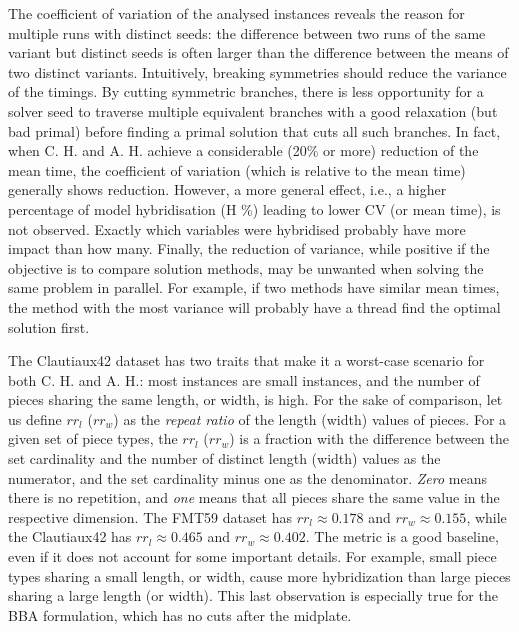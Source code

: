 \documentclass[ppgc,tese,english,formais,babel]{iiufrgs}
\begin{document}
The coefficient of variation of the analysed instances reveals the reason for multiple runs with distinct seeds: the difference between two runs of the same variant but distinct seeds is often larger than the difference between the means of two distinct variants.
Intuitively, breaking symmetries should reduce the variance of the timings.
By cutting symmetric branches, there is less opportunity for a solver seed to traverse multiple equivalent branches with a good relaxation (but bad primal) before finding a primal solution that cuts all such branches.
In fact, when C. H. and A. H. achieve a considerable (20\% or more) reduction of the mean time, the coefficient of variation (which is relative to the mean time) generally shows reduction.
However, a more general effect, i.e., a higher percentage of model hybridisation (H \%) leading to lower CV (or mean time), is not observed.
Exactly which variables were hybridised probably have more impact than how many.
Finally, the reduction of variance, while positive if the objective is to compare solution methods, may be unwanted when solving the same problem in parallel.
For example, if two methods have similar mean times, the method with the most variance will probably have a thread find the optimal solution first.

The Clautiaux42 dataset has two traits that make it a worst-case scenario for both C. H. and A. H.: most instances are small instances, and the number of pieces sharing the same length, or width, is high.
For the sake of comparison, let us define \(rr_l\) (\(rr_w\)) as the \emph{repeat ratio} of the length (width) values of pieces.
For a given set of piece types, the \(rr_l\) (\(rr_w\)) is a fraction with the difference between the set cardinality and the number of distinct length (width) values as the numerator, and the set cardinality minus one as the denominator.
\emph{Zero} means there is no repetition, and \emph{one} means that all pieces share the same value in the respective dimension.
The FMT59 dataset has \(rr_l \approx 0.178\) and \(rr_w \approx 0.155\), while the Clautiaux42 has \(rr_l \approx 0.465\) and \(rr_w \approx 0.402\).
The metric is a good baseline, even if it does not account for some important details.
For example, small piece types sharing a small length, or width, cause more hybridization than large pieces sharing a large length (or width).
This last observation is especially true for the BBA formulation, which has no cuts after the midplate.
\end{document}
